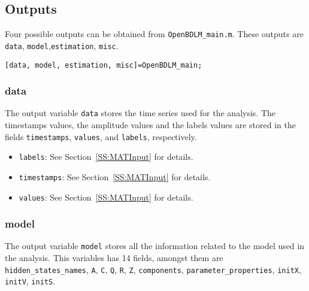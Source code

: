{\subsection{Outputs}

 Four possible outputs can be obtained from \lstinline[basicstyle = \mlttfamily \small]!OpenBDLM_main.m!.
 These outputs are \lstinline[basicstyle = \mlttfamily \small ]!data!, \lstinline[basicstyle = \mlttfamily \small ]!model!,\lstinline[basicstyle = \mlttfamily \small ]!estimation!, \lstinline[basicstyle = \mlttfamily \small ]!misc!.\\
 
 \raggedright{\colorbox{light-gray}{\lstinline[basicstyle = \mlttfamily \small]![data, model, estimation, misc]=OpenBDLM_main;!}} \\

\subsubsection{data} 

The output variable \lstinline[basicstyle = \mlttfamily \small]!data! stores the time series used for the analysis. 
The timestamps values, the amplitude values and the labels values are stored in the fields \lstinline[basicstyle = \mlttfamily \small ]!timestamps!, \lstinline[basicstyle = \mlttfamily \small ]!values!, and \lstinline[basicstyle = \mlttfamily \small ]!labels!, respectively.
\begin{itemize}
\item \lstinline[basicstyle = \mlttfamily \small ]!labels!:  See Section~\ref{SS:MATInput} for details.
\item \lstinline[basicstyle = \mlttfamily \small ]!timestamps!:  See Section~\ref{SS:MATInput} for details.
\item \lstinline[basicstyle = \mlttfamily \small ]!values!:  See Section~\ref{SS:MATInput} for details.
\end{itemize}

\subsubsection{model}
The output variable \lstinline[basicstyle = \mlttfamily \small]!model! stores all the information related to the model used in the analysis. 
This variables has 14 fields, amongst them are \lstinline[basicstyle = \mlttfamily \small ]!hidden_states_names!, \lstinline[basicstyle = \mlttfamily \small ]!A!, \lstinline[basicstyle = \mlttfamily \small ]!C!, \lstinline[basicstyle = \mlttfamily \small ]!Q!, \lstinline[basicstyle = \mlttfamily \small ]!R!, \lstinline[basicstyle = \mlttfamily \small ]!Z!, \lstinline[basicstyle = \mlttfamily \small ]!components!, \lstinline[basicstyle = \mlttfamily \small ]!parameter_properties!, \lstinline[basicstyle = \mlttfamily \small ]!initX!, \lstinline[basicstyle = \mlttfamily \small ]!initV!, \lstinline[basicstyle = \mlttfamily \small ]!initS!.


}
